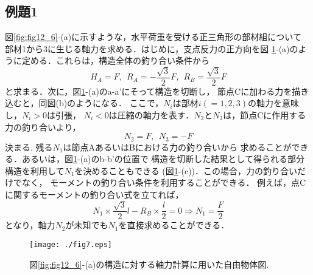 \documentclass[10pt,a4j]{jbook}
\begin{document}
\subsection{例題1}
図\ref{fig:fig12_6}-(a)に示すような，水平荷重を受ける正三角形の部材組について
部材1から3に生じる軸力を求める．はじめに，支点反力の正方向を図
\ref{fig:fig12_7}-(a)のように定める．これらは，構造全体の釣り合い条件から
\begin{equation}
	H_A=F, \ \ 
	R_A=-\frac{\sqrt{3}}{2}F, \ \ 
	R_B= \frac{\sqrt{3}}{2}F
\end{equation}
と求まる．次に，図\ref{fig:fig12_7}-(a)のa-a'にそって構造を切断し，
節点Cに加わる力を描き込むと，同図(b)のようになる．
ここで，$N_i$は部材$i(=1,2,3)$の軸力を意味し，$N_i>0$は引張，
$N_i<0$は圧縮の軸力を表す．$N_2$と$N_3$は，節点Cに作用する力の釣り合いより，
\begin{equation}
	N_2=F, \ \ N_3=-F
\end{equation}
決まる.  残る$N_1$は節点AあるいはBにおける力の釣り合いから
求めることができる．あるいは，図\ref{fig:fig12_7}-(a)のb-b'の位置で
構造を切断した結果として得られる部分構造を利用して$N_1$を決めることもできる
(図\ref{fig:fig12_7}-(c))．この場合，力の釣り合いだけでなく，
モーメントの釣り合い条件を利用することができる．
例えば，点Cに関するモーメントの釣り合い式を立てれば，
\begin{equation}
	N_1\times \frac{\sqrt{3}}{2}l -R_B\times \frac{l}{2}=0 \Rightarrow
	N_1=\frac{F}{2}
\end{equation}
となり，軸力$N_2$が未知でも$N_1$を直接求めることができる．
\begin{figure}[h]
	\begin{center}
	\texttt{[image: ./fig7.eps]} 
	\end{center}
	\caption{
		図\ref{fig:fig12_6}-(a)の構造に対する軸力計算に用いた自由物体図.
	} 
	\label{fig:fig12_7}
\end{figure}
\end{document}
